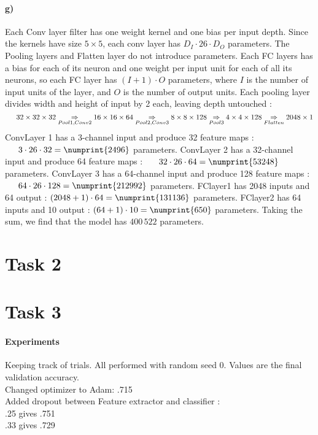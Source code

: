 \documentclass{article}
\begin{document}
		\paragraph{g)}
		Each Conv layer filter has one weight kernel and one bias per input depth. Since the kernels have size $5 \times 5$, each conv layer has $D_I \cdot 26 \cdot D_O$ parameters.\newline  
		The Pooling layers and Flatten layer do not introduce parameters. \newline
		Each FC layers has a bias for each of its neuron and one weight per input unit for each of all its neurons, so each FC layer has $ (I+1) \cdot O $ parameters, where $I$ is the number of input units of the layer, and $O$ is the number of output units. \newline
		Each pooling layer divides width and height of input by 2 each, leaving depth untouched :
		\[
			\indent 
			{32\times 32 \times 32}		\underset{Pool1, Conv2}{\Rightarrow}
		 	{16 \times 16 \times 64}	\underset{Pool2, Conv3}{\Rightarrow}
		    { 8 \times 8 \times 128}	\underset{Pool3}{\Rightarrow}
		    { 4 \times 4 \times 128}	\underset{Flatten}{\Rightarrow}
		    2048 \times 1
		 \]
		 ConvLayer 1 has a 3-channel input and produce 32 feature maps : \newline
		 $ \indent 3 \cdot 26 \cdot 32 = \numprint{2496}$ parameters. \newline
		 ConvLayer 2 has a 32-channel input and produce 64 feature maps : \newline
		 $ \indent 32 \cdot 26 \cdot 64 = \numprint{53248} $ parameters. \newline
		 ConvLayer 3 has a 64-channel input and produce 128 feature maps : \newline
		 $\indent 64 \cdot 26 \cdot 128 = \numprint{212992}$ parameters. \newline
		 FClayer1 has 2048 inputs and 64 output : 
		 $ (2048 + 1) \cdot 64 = \numprint{131136} $ parameters. \newline
		 FClayer2 has 64 inputs and 10 output : 
		 $ (64 + 1) \cdot 10 = \numprint{650}  $ parameters. \newline
		 Taking the sum, we find that the model has $400\,522$ parameters.
	\section*{Task 2}
	
	\section*{Task 3}
	
	\paragraph{Experiments} Keeping track of trials. All performed with random seed 0. Values are the final validation accuracy.\\
	\indent Changed optimizer to Adam: .715\\
	\indent Added dropout between Feature extractor and classifier :\\
	 \indent \indent .25 gives .751\\
	 \indent \indent  .33 gives .729
\end{document}
